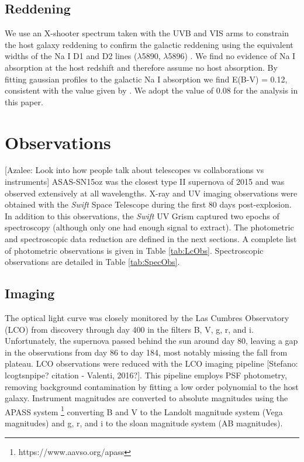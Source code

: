 \documentclass[preprint]{aastex61}
\newcommand{\azaleecomment}[1]{{\color{red} [{#1}]}}
\newcommand{\Azalee}[1]{\azaleecomment{Azalee: #1}}
\newcommand{\stefanocomment}[1]{{\color{cyan} [{#1}]}}
\newcommand{\Stefano}[1]{\stefanocomment{Stefano: #1}}
\begin{document}
\subsection{Reddening}
We use an X-shooter spectrum taken with the UVB and VIS arms to constrain the host galaxy reddening to confirm the galactic reddening using the equivalent widths of the Na I D1 and D2 lines ($\lambda$5890, $\lambda$5896) \citep{2012poznanski}. 
We find no evidence of Na I absorption at the host redshift and therefore assume no host absorption. 
By fitting gaussian profiles to the galactic Na I absorption we find E(B-V) = 0.12, consistent with the value given by \citet{2011schlafly}. 
We adopt the \citet{2011schlafly}  value of 0.08 for the analysis in this paper. 

\section{Observations}
\Azalee{Look into how people talk about telescopes vs collaborations vs instruments}
ASAS-SN15oz was the closest type II supernova of 2015 and was observed extensively at all wavelengths. X-ray and UV imaging observations were obtained with the \textit{Swift} Space Telescope during the first 80 days post-explosion.
In addition to this observations, the \textit{Swift} UV Grism captured two epochs of spectroscopy (although only one had enough signal to extract). 
The photometric and spectroscopic data reduction are defined in the next sections. 
A complete list of photometric observations is given in Table \ref{tab:LcObs}.  
Spectroscopic observations are detailed in Table \ref{tab:SpecObs}.

\subsection{Imaging}
The optical light curve was closely monitored by the Las Cumbres Observatory (LCO) from discovery through day 400 in the filters B, V, g, r, and i. 
Unfortunately, the supernova passed behind the sun around day 80, leaving a gap in the observations from day 86 to day 184, most notably missing the fall from plateau.
LCO observations were reduced with the LCO imaging pipeline \Stefano{lcogtsnpipe? citation - Valenti, 2016?}. 
This pipeline employs PSF photometry, removing background contamination by fitting a low order polynomial to the host galaxy.
Instrument magnitudes are converted to absolute magnitudes using the APASS system \footnote{https://www.aavso.org/apass} converting B and V to the Landolt magnitude system (Vega magnitudes) and g, r, and i to the sloan magnitude system (AB magnitudes). 
\end{document}
